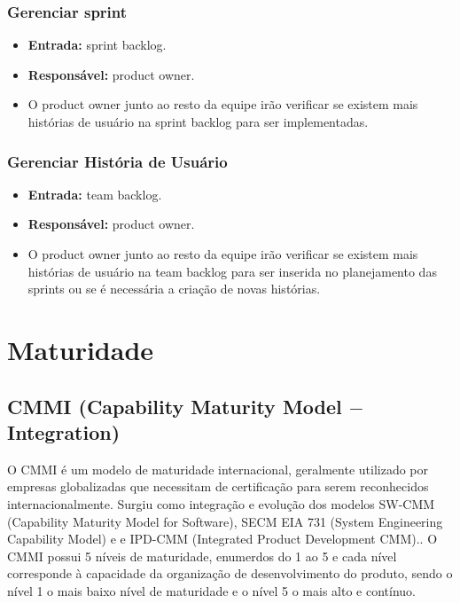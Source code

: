 \subsubsection{Gerenciar sprint}
  \begin{itemize}
    \item \textbf{Entrada:} sprint backlog.
    \item \textbf{Responsável:} product owner.
    \item O product owner junto ao resto da equipe irão verificar se existem mais histórias de usuário na sprint backlog para ser
      implementadas.
  \end{itemize}

\subsubsection{Gerenciar História de Usuário}
  \begin{itemize}
    \item \textbf{Entrada:} team backlog.
    \item \textbf{Responsável:} product owner.
    \item O product owner junto ao resto da equipe irão verificar se existem mais histórias de usuário na team backlog para ser
      inserida no planejamento das sprints ou se é necessária a criação de novas histórias.
  \end{itemize}

\section{Maturidade}

\subsection{CMMI (Capability Maturity Model $-$ Integration)}

  O CMMI é um modelo de maturidade internacional, geralmente utilizado por empresas
  globalizadas que necessitam de certificação para serem reconhecidos internacionalmente.
  Surgiu como integração e evolução dos modelos SW-CMM (Capability Maturity Model for Software),
  SECM EIA 731 (System Engineering Capability Model) e  e IPD-CMM
  (Integrated Product Development CMM).\cite{mct2006}.
  O CMMI possui 5 níveis de maturidade, enumerdos do 1 ao 5 e cada nível corresponde
  à capacidade da organização de desenvolvimento do produto, sendo o nível 1 o mais
  baixo nível de maturidade e o nível 5 o mais alto e contínuo.

